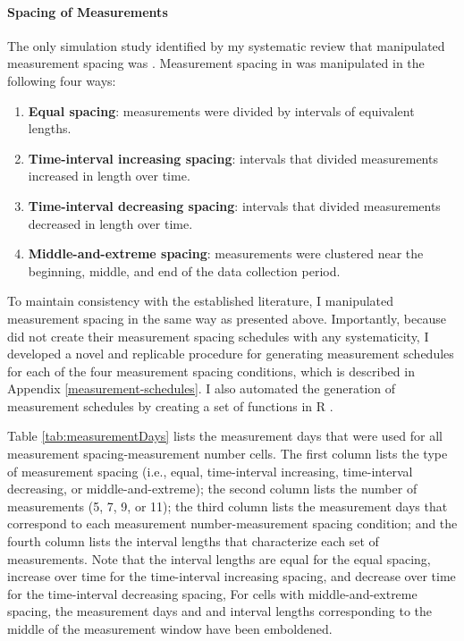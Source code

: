 \documentclass[
12pt, %
twoside,
english]{guelphthesis}
\begin{document}
\hypertarget{spacing-measurements}{%
\paragraph{Spacing of Measurements}\label{spacing-measurements}}

The only simulation study identified by my systematic review that manipulated measurement spacing was
\textcite{timmons2015}. Measurement spacing in \textcite{timmons2015} was manipulated in the
following four ways:
\begin{enumerate}
\def\labelenumi{\arabic{enumi})}
\item
  \textbf{Equal spacing}: measurements were divided by intervals of
  equivalent lengths.
\item
  \textbf{Time-interval increasing spacing}: intervals that divided measurements
  increased in length over time.
\item
  \textbf{Time-interval decreasing spacing}: intervals that divided measurements
  decreased in length over time.
\item
  \textbf{Middle-and-extreme spacing}: measurements were clustered near the
  beginning, middle, and end of the data collection period.
\end{enumerate}
\noindent To maintain consistency with the established literature, I manipulated measurement spacing in the same way as \textcite{timmons2015} presented above. Importantly, because \textcite{timmons2015} did not create their measurement spacing schedules with any systematicity, I developed a novel and replicable procedure for generating measurement schedules for each of the four measurement spacing conditions, which is described in Appendix \ref{measurement-schedules}. I also automated the generation of measurement schedules by creating a set of functions in R \autocite{rstudio}.

Table \ref{tab:measurementDays} lists the measurement days that were
used for all measurement spacing-measurement number cells. The first
column lists the type of measurement spacing (i.e., equal, time-interval
increasing, time-interval decreasing, or middle-and-extreme); the second
column lists the number of measurements (5, 7, 9, or 11); the third
column lists the measurement days that correspond to each measurement
number-measurement spacing condition; and the fourth column lists the
interval lengths that characterize each set of measurements. Note that
the interval lengths are equal for the equal spacing, increase over time
for the time-interval increasing spacing, and decrease over time for the
time-interval decreasing spacing, For cells with middle-and-extreme
spacing, the measurement days and and interval lengths corresponding to
the middle of the measurement window have been emboldened.
\end{document}
